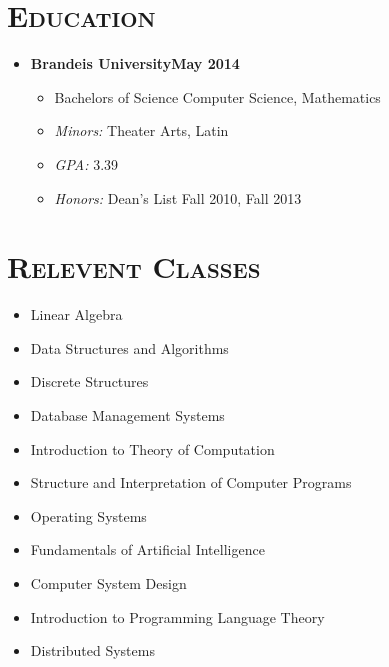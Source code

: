 \documentclass[10pt, oneside]{article}
\newcommand{\lr}[2]{#1\hfill#2}
\newcommand{\reseducation}[6]{
  \begin{ressection}{Education}
  \item[] \lr{\bfseries \selectfont #1\normalfont} {#2}
    \vspace{-8pt}
    \begin{itemize} \itemsep-2pt
    \item[] #4
    \item[] \textsl{Minors: }#5
    \item[] \textsl{GPA: }#3
    \item[] \textsl{Honors: }#6
    \end{itemize}
  \end{ressection}
}
\newenvironment{ressection}[1]{
  \section{\normalsize \scshape \selectfont #1 \normalfont}
  \vspace{-4pt}
  \begin{itemize} \itemsep-2pt
  }{
  \end{itemize}
  \vspace{-20pt}
}
\newenvironment{reslist}[1]
{
  \section{\normalsize \scshape \selectfont #1  \normalfont}
  \normalfont
  \vspace{-12pt}
  \begin{flushleft}
    \begin{multicols}{3}
      \begin{itemize} \itemsep -3pt
      }{
      \end{itemize}
    \end{multicols}
  \end{flushleft}
  \vspace{-20pt}
}
\begin{document}
\reseducation{Brandeis University}{May 2014}{3.39}{Bachelors of Science Computer Science, Mathematics}{Theater Arts, Latin}{Dean's List Fall 2010, Fall 2013}
\begin{reslist}{Relevent Classes}
\item Linear Algebra
\item Data Structures and Algorithms
\item Discrete Structures
\item Database Management Systems
\item Introduction to Theory of Computation
\item Structure and Interpretation of Computer Programs
\item Operating Systems
\item Fundamentals of Artificial Intelligence
\item Computer System Design
\item Introduction to Programming Language Theory
\item Distributed Systems
\end{reslist}
\end{document}
